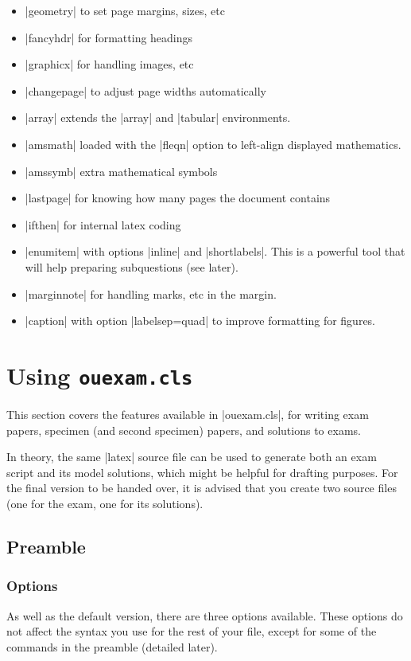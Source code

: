 \documentclass[a4paper]{ltxguide}
\newcommand\3{\unskip\enspace\fbox{\fontsize{4}{4}\selectfont NEW 3.0}}
\begin{document}
\begin{itemize}
\item |geometry| to set page margins, sizes, etc
\item |fancyhdr| for formatting headings
\item |graphicx| for handling images, etc
\item |changepage| to adjust page widths automatically
\item |array| extends the |array| and |tabular| environments.
\item |amsmath| loaded with the |fleqn| option to left-align displayed mathematics.
\item |amssymb| extra mathematical symbols
\item |lastpage| for knowing how many pages the document contains
\item |ifthen| for internal latex coding
\item |enumitem| with options |inline| and |shortlabels|. This is a powerful tool that will help preparing subquestions (see later).
\item |marginnote| for handling marks, etc in the margin.
\item |caption| with option |labelsep=quad| to improve formatting for figures.
\end{itemize}



%
%
%
%
%
%
%
%
%
%
\section{Using \texttt{ouexam.cls}}

This section covers the features available in |ouexam.cls|, for writing exam papers, specimen (and second specimen) papers, and solutions to exams. 

In theory, the same |latex| source file can be used to generate both an exam script and its model solutions, which might be helpful for drafting purposes. For the final version to be handed over, it is advised that you create two source files (one for the exam, one for its solutions).

\subsection{Preamble}

\subsubsection{Options}
As well as the default version, there are three options available. These options do not affect the syntax you use for the rest of your file, except for some of the commands in the preamble (detailed later).
\end{document}
